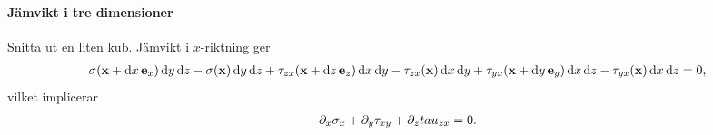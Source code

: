 \paragraph{Jämvikt i tre dimensioner}
Snitta ut en liten kub. Jämvikt i $x$-riktning ger
\begin{align*}
	\sigma(\vb{x} + \dd{x}\vb{e}_{x})\dd{y}\dd{z} - \sigma(\vb{x})\dd{y}\dd{z} + \tau_{zx}(\vb{x} + \dd{z}\vb{e}_{z})\dd{x}\dd{y} - \tau_{zx}(\vb{x})\dd{x}\dd{y} + \tau_{yx}(\vb{x} + \dd{y}\vb{e}_{y})\dd{x}\dd{z} - \tau_{yx}(\vb{x})\dd{x}\dd{z} = 0,
\end{align*}
vilket implicerar
\begin{align*}
	\partial_{x}\sigma_{x} + \partial_{y}\tau_{xy} + \partial_{z}tau_{zx} = 0.
\end{align*}
